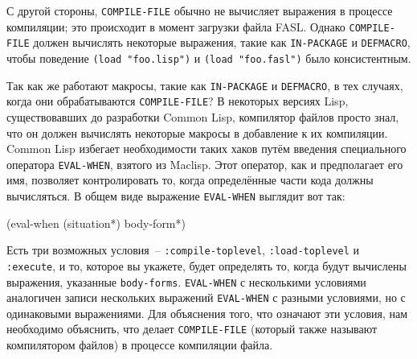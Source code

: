 С другой стороны, \lstinline{COMPILE-FILE} обычно не вычисляет выражения в процессе компиляции;
это происходит в момент загрузки файла FASL. Однако \lstinline{COMPILE-FILE} должен вычислять
некоторые выражения, такие как \lstinline{IN-PACKAGE} и \lstinline{DEFMACRO}, чтобы поведение
\lstinline{(load "foo.lisp")} и \lstinline{(load "foo.fasl")} было консистентным.

Так как же работают макросы, такие как \lstinline{IN-PACKAGE} и \lstinline{DEFMACRO}, в тех случаях,
когда они обрабатываются \lstinline{COMPILE-FILE}?  В некоторых версиях Lisp, существовавших до
разработки Common Lisp, компилятор файлов просто знал, что он должен вычислять некоторые
макросы в добавление к их компиляции.  Common Lisp избегает необходимости таких хаков
путём введения специального оператора \lstinline{EVAL-WHEN}, взятого из Maclisp.  Этот оператор,
как и предполагает его имя, позволяет контролировать то, когда определённые части кода
должны вычисляться. В общем виде выражение \lstinline{EVAL-WHEN} выглядит вот так:

\begin{myverb}
(eval-when (situation*)
  body-form*)
\end{myverb}

Есть три возможных условия~-- \lstinline{:compile-toplevel}, \lstinline{:load-toplevel}
и \lstinline{:execute}, и то, которое вы укажете, будет определять то, когда будут вычислены
выражения, указанные \lstinline{body-forms}.  \lstinline{EVAL-WHEN} с несколькими условиями
аналогичен записи нескольких выражений \lstinline{EVAL-WHEN} с разными условиями, но с
одинаковыми выражениями.  Для объяснения того, что означают эти условия, нам необходимо
объяснить, что делает \lstinline{COMPILE-FILE} (который также называют компилятором файлов) в
процессе компиляции файла.

